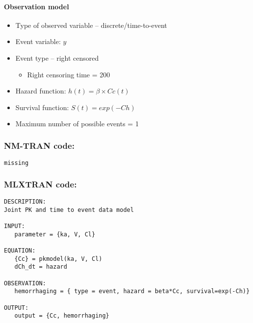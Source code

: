 
\paragraph{Observation model}
\begin{itemize}
\item
Type of observed variable -- discrete/time-to-event
\item
Event variable: $y$
\item
Event type -- right censored
\begin{itemize}
\item
Right censoring time = 200
\end{itemize}
\item
Hazard function: $h(t) = \beta \times Cc(t)$
\item
Survival function: $S(t) =exp(-Ch)$
\item
Maximum number of possible events = 1
\end{itemize}

\subsubsection{NM-TRAN code:}

\myStartLine
\lstset{language=NONMEMdataSet}
\begin{lstlisting}
missing
\end{lstlisting}
\myEndLine

\subsubsection{MLXTRAN code:}

\myStartLine
\lstset{language=MLXTRANcode}
\begin{lstlisting}
DESCRIPTION:
Joint PK and time to event data model

INPUT:
   parameter = {ka, V, Cl}

EQUATION:
   {Cc} = pkmodel(ka, V, Cl)
   dCh_dt = hazard	

OBSERVATION:
   hemorrhaging = { type = event, hazard = beta*Cc, survival=exp(-Ch)}

OUTPUT:
   output = {Cc, hemorrhaging}

\end{lstlisting}
\myEndLine

